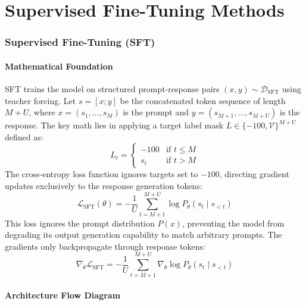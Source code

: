 \newpage
\part{Supervised Fine-Tuning Methods}

\section{Supervised Fine-Tuning (SFT)}

\subsection{Mathematical Foundation}
SFT trains the model on structured prompt-response pairs $(x, y) \sim \mathcal{D}_{\text{SFT}}$ using teacher forcing. Let $s = [x ; y]$ be the concatenated token sequence of length $M + U$, where $x = (s_1, \ldots, s_M)$ is the prompt and $y = (s_{M+1}, \ldots, s_{M+U})$ is the response. The key math lies in applying a target label mask $L \in \{-100, \mathcal{V}\}^{M+U}$ defined as:
\begin{equation}
  L_t = \begin{cases} -100 & \text{if } t \le M \\ s_t & \text{if } t > M \end{cases}
\end{equation}
The cross-entropy loss function ignores targets set to $-100$, directing gradient updates exclusively to the response generation tokens:
\begin{equation}
  \mathcal{L}_{\text{SFT}}(\theta) = -\frac{1}{U} \sum_{t=M+1}^{M+U} \log P_\theta(s_t \mid s_{<t})
\end{equation}
This loss ignores the prompt distribution $P(x)$, preventing the model from degrading its output generation capability to match arbitrary prompts.
The gradients only backpropagate through response tokens:
\begin{equation}
  \nabla_\theta \mathcal{L}_{\text{SFT}} = -\frac{1}{U} \sum_{t=M+1}^{M+U} \nabla_\theta \log P_\theta(s_t \mid s_{<t})
\end{equation}

\subsection{Architecture Flow Diagram}

